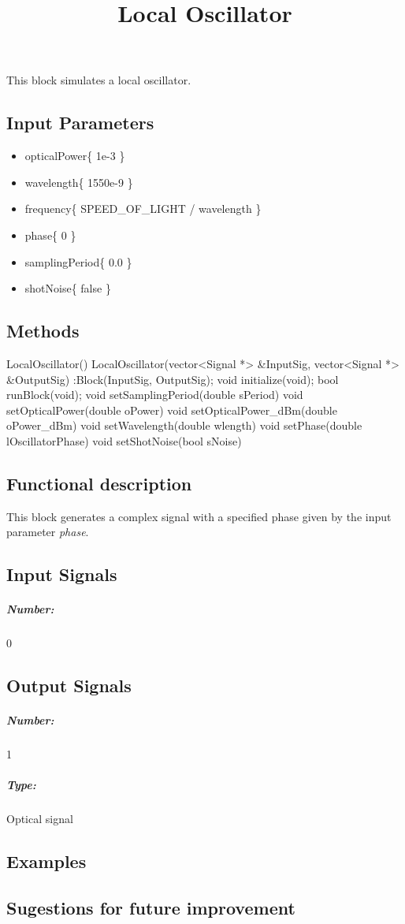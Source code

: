 \documentclass[a4paper]{article}
\title{Local Oscillator}
\begin{document}
\maketitle

This block simulates a local oscillator.  

\subsection*{Input Parameters}

\begin{itemize}
	\item opticalPower\{ 1e-3 \} 
	\item wavelength\{ 1550e-9 \}
	\item frequency\{ SPEED\_OF\_LIGHT / wavelength \}
	\item phase\{ 0 \}
	\item samplingPeriod\{ 0.0 \}
	\item shotNoise\{ false \}
\end{itemize}

\subsection*{Methods}
 
LocalOscillator() {}
\bigbreak
LocalOscillator(vector<Signal *> \&InputSig, vector<Signal *> \&OutputSig) :Block(InputSig, OutputSig){};
\bigbreak
void initialize(void);
\bigbreak
bool runBlock(void);
\bigbreak
void setSamplingPeriod(double sPeriod) 
\bigbreak
void setOpticalPower(double oPower) 
\bigbreak
void setOpticalPower\_dBm(double oPower\_dBm) 
\bigbreak
void setWavelength(double wlength) 
\bigbreak
void setPhase(double lOscillatorPhase) 
\bigbreak
void setShotNoise(bool sNoise)

\subsection*{Functional description}

This block generates a complex signal with a specified phase given by the input parameter \textit{phase}. 

\subsection*{Input Signals}

\subparagraph*{Number:} 0

\subsection*{Output Signals}

\subparagraph*{Number:} 1

\subparagraph*{Type:} Optical signal

\subsection*{Examples} 

\subsection*{Sugestions for future improvement}
\end{document}
